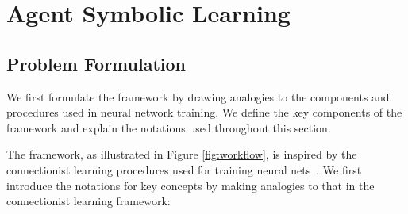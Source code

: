 \section{Agent Symbolic Learning}




\subsection{Problem Formulation}

We first formulate the \baby framework by drawing analogies to the components and procedures used in neural network training. We define the key components of the framework and explain the notations used throughout this section.

The \baby framework, as illustrated in Figure \ref{fig:workflow}, is inspired by the connectionist learning procedures used for training neural nets~\citep{hinton1990connectionist}. We first introduce the notations for key concepts by making analogies to that in the connectionist learning framework:

